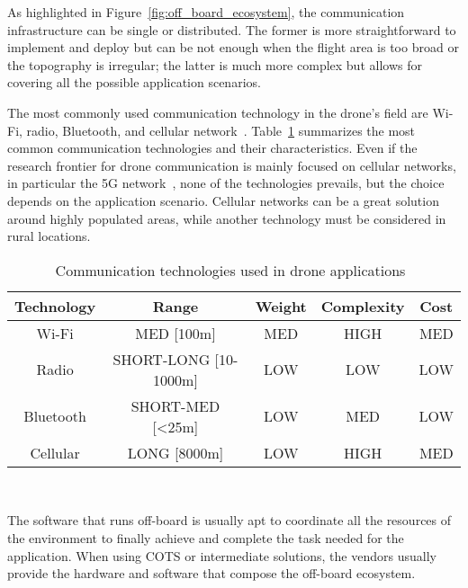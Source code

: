 As highlighted in Figure~\ref{fig:off_board_ecosystem}, the communication infrastructure can be single or distributed.
The former is more straightforward to implement and deploy but can be not enough when the flight area is too broad or the topography is irregular; 
the latter is much more complex but allows for covering all the possible application scenarios.

The most commonly used communication technology in the drone's field are Wi-Fi, radio, Bluetooth, and cellular network~\cite{pantelimon2019surveyCommunication}. 
Table~\ref{table:communication_technologies} summarizes the most common communication technologies and their characteristics.
Even if the research frontier for drone communication is mainly focused on cellular networks, in particular the 5G network~\cite{sharma2020communication},
none of the technologies prevails, but the choice depends on the application scenario. 
Cellular networks can be a great solution around highly populated areas, while another technology must be considered in rural locations.


\begin{table}[H]
    \centering
        \begin{tabular}{|c|c|c|c|c|}
        \hline
        \rowcolor{bluepoli!40}
        \textbf{Technology} & \textbf{Range} & \textbf{Weight} & \textbf{Complexity} & \textbf{Cost} \\
        \hline \hline
        Wi-Fi & MED [100m] & MED & HIGH & MED \\
        \hline
        Radio & SHORT-LONG [10-1000m] & LOW & LOW & LOW \\
        \hline
        Bluetooth & SHORT-MED [<25m] & LOW & MED & LOW \\
        \hline
        Cellular & LONG [8000m] & LOW & HIGH & MED \\
        \hline
        \end{tabular}
        \\[10pt]
        \caption[Communication technologies]{Communication technologies used in drone applications~\cite{pantelimon2019surveyCommunication}}\label{table:communication_technologies}
    \end{table}

The software that runs off-board is usually apt to coordinate all the resources of the environment to finally achieve and 
complete the task needed for the application. When using COTS or intermediate solutions, the vendors usually provide the 
hardware and software that compose the off-board ecosystem.

